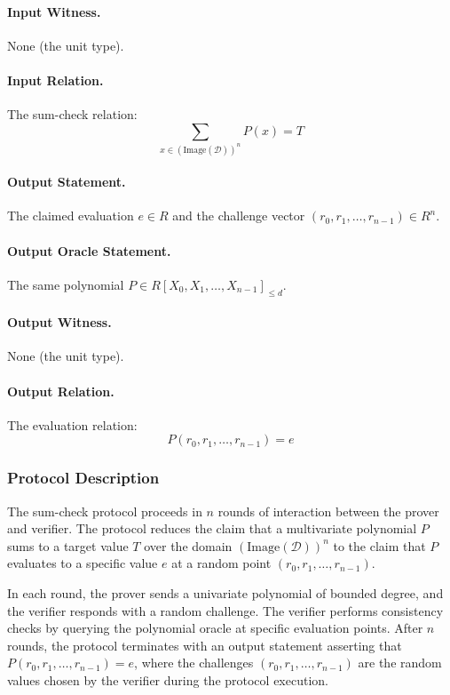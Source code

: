 \paragraph{Input Witness.} None (the unit type).

\paragraph{Input Relation.} The sum-check relation:
\[
\sum_{x \in (\text{Image}(\mathcal{D}))^n} P(x) = T
\]

\paragraph{Output Statement.} The claimed evaluation $e \in R$ and the challenge vector $(r_0, r_1, \ldots, r_{n-1}) \in R^n$.

\paragraph{Output Oracle Statement.} The same polynomial $P \in R[X_0, X_1, \ldots, X_{n-1}]_{\leq d}$.

\paragraph{Output Witness.} None (the unit type).

\paragraph{Output Relation.} The evaluation relation:
\[
P(r_0, r_1, \ldots, r_{n-1}) = e
\]

\subsubsection{Protocol Description}

The sum-check protocol proceeds in $n$ rounds of interaction between the prover and verifier. The protocol reduces the claim that a multivariate polynomial $P$ sums to a target value $T$ over the domain $(\text{Image}(\mathcal{D}))^n$ to the claim that $P$ evaluates to a specific value $e$ at a random point $(r_0, r_1, \ldots, r_{n-1})$.

In each round, the prover sends a univariate polynomial of bounded degree, and the verifier responds with a random challenge. The verifier performs consistency checks by querying the polynomial oracle at specific evaluation points. After $n$ rounds, the protocol terminates with an output statement asserting that $P(r_0, r_1, \ldots, r_{n-1}) = e$, where the challenges $(r_0, r_1, \ldots, r_{n-1})$ are the random values chosen by the verifier during the protocol execution.

